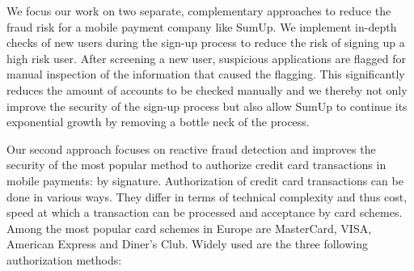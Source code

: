 \documentclass[a4paper, oneside]{csthesis}
\begin{document}
We focus our work on two separate, complementary approaches to reduce the fraud risk for a mobile payment company like SumUp.
We implement in-depth checks of new users during the sign-up process to reduce the risk of signing up a high risk user. After screening a new user, suspicious applications are flagged for manual inspection of the information that caused the flagging. This significantly reduces the amount of accounts to be checked manually and we thereby not only improve the security of the sign-up process but also allow SumUp to continue its exponential growth by removing a bottle neck of the process.

Our second approach focuses on reactive fraud detection and improves the security of the most popular method to authorize credit card transactions in mobile payments: by signature.
Authorization of credit card transactions can be done in various ways. They differ in terms of technical complexity and thus cost, speed at which a transaction can be processed and acceptance by card schemes. Among the most popular card schemes in Europe are MasterCard, VISA, American Express and Diner's Club. Widely used are the three following authorization methods:
\end{document}
